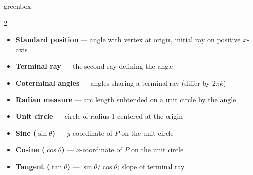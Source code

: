 \documentclass[10pt]{article}
\begin{document}
\begin{skillbox}{greenbox}
  \begin{multicols}{2}
    \begin{itemize}[leftmargin=1.2em, itemsep=2pt]
      \item \textbf{Standard position} --- angle with vertex at origin, initial ray on positive $x$-axis
      \item \textbf{Terminal ray} --- the second ray defining the angle
      \item \textbf{Coterminal angles} --- angles sharing a terminal ray (differ by $2\pi k$)
      \item \textbf{Radian measure} --- arc length subtended on a unit circle by the angle
      \item \textbf{Unit circle} --- circle of radius 1 centered at the origin
      \item \textbf{Sine ($\sin\theta$)} --- $y$-coordinate of $P$ on the unit circle
      \item \textbf{Cosine ($\cos\theta$)} --- $x$-coordinate of $P$ on the unit circle
      \item \textbf{Tangent ($\tan\theta$)} --- $\sin\theta / \cos\theta$; slope of terminal ray
    \end{itemize}
  \end{multicols}
\end{skillbox}

\vspace{6pt}
\end{document}
